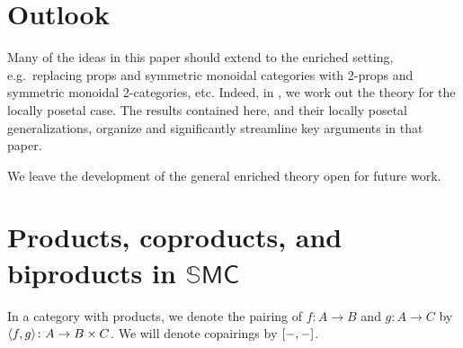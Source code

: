 \documentclass[11pt, oneside, article]{memoir}
\theoremstyle{plain}
\theoremstyle{definition}
\theoremstyle{remark}
\DeclarePairedDelimiter{\pair}{\langle}{\rangle}
\DeclarePairedDelimiter{\copair}{[}{]}
\begin{document}
\chapter{Outlook}

Many of the ideas in this paper should extend to the enriched setting, e.g.\ replacing props and symmetric monoidal categories with 2-props and symmetric monoidal 2-categories, etc. Indeed, in \cite{fong2019abelian}, we work out the theory for the locally posetal case. The results contained here, and their locally posetal generalizations, organize and significantly streamline key arguments in that paper.

We leave the development of the general enriched theory open for future work.


\printbibliography

\newpage
\appendix

\chapter{Products, coproducts, and biproducts in $\mathbb{S}\mathsf{MC}$}\label{chap.proofs}


In a category with products, we denote the pairing of $f\colon A\to B$ and $g\colon A\to C$ by $\pair{f,g}\colon A\to B\times C$. We will denote copairings by $\copair{-,-}$.
\end{document}
